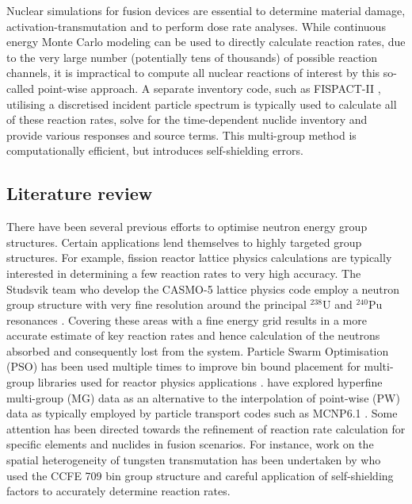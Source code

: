 
Nuclear simulations for fusion devices are essential to determine material damage, activation-transmutation and to perform dose rate analyses. While continuous energy Monte Carlo modeling can be used to directly calculate reaction rates, due to the very large number (potentially tens of thousands) of possible reaction channels, it is impractical to compute all nuclear reactions of interest by this so-called point-wise approach. A separate inventory code, such as FISPACT-II \cite{fispact2015}, utilising a discretised incident particle spectrum is typically used to calculate all of these reaction rates, solve for the time-dependent nuclide inventory and provide various responses and source terms. This multi-group method is computationally efficient, but introduces self-shielding errors.

\subsection{Literature review}

There have been several previous efforts to optimise neutron energy group structures. Certain applications lend themselves to highly targeted group structures. For example, fission reactor lattice physics calculations are typically interested in determining a few reaction rates to very high accuracy. The Studsvik team who develop the CASMO-5 lattice physics code employ a neutron group structure with very fine resolution around the principal $^{238}\mathrm{U}$ and $^{240}\mathrm{Pu}$ resonances \cite{Rhodes2006}. Covering these areas with a fine energy grid results in a more accurate estimate of key reaction rates and hence calculation of the neutrons absorbed and consequently lost from the system. Particle Swarm Optimisation (PSO) has been used multiple times to improve bin bound placement for multi-group libraries used for reactor physics applications \cite{Yi2013}\cite{Akbari2012}\cite{Akbari2013}\cite{Fleming2016}. \citet{Morgan2013} have explored hyperfine multi-group (MG) data as an alternative to the interpolation of point-wise (PW) data as typically employed by particle transport codes such as MCNP6.1 \cite{goorley2012}. Some attention has been directed towards the refinement of reaction rate calculation for specific elements and nuclides in fusion scenarios. For instance, work on the spatial heterogeneity of tungsten transmutation has been undertaken by \citet{Gilbert2016} who used the CCFE 709 bin group structure and careful application of self-shielding factors to accurately determine reaction rates.

